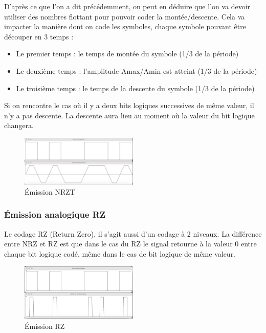D’après ce que l’on a dit précédemment, on peut en déduire que l’on va devoir utiliser des nombres flottant pour pouvoir coder la montée/descente. Cela va impacter la manière dont on code les symboles, chaque symbole pouvant être découper en 3 temps :

\begin{itemize}
    \item Le premier temps : le temps de montée du symbole (1/3 de la période)
    \item Le deuxième temps : l’amplitude Amax/Amin est atteint (1/3 de la période)
    \item Le troisième temps : le temps de la descente du symbole (1/3 de la période)
\end{itemize}

Si on rencontre le cas où il y a deux bits logiques successives de même valeur, il n’y a pas descente. La descente aura lieu au moment où la valeur du bit logique changera.

\begin{figure}[H]
    \centering
    \includegraphics[width=0.5\textwidth]{img/etape2_emission_NRZT.png}
    \caption{Émission NRZT}
    \label{fig:teb1}
\end{figure}

\subsubsection{Émission analogique RZ}

Le codage RZ (Return Zero), il s’agit aussi d’un codage à 2 niveaux. La différence entre NRZ et RZ est que dans le cas du RZ le signal retourne à la valeur 0 entre chaque bit logique codé, même dans le cas de bit logique de même valeur.

\begin{figure}[H]
    \centering
    \includegraphics[width=0.5\textwidth]{img/etape2_emission_RZ.png}
    \caption{Émission RZ}
    \label{fig:teb1}
\end{figure}

